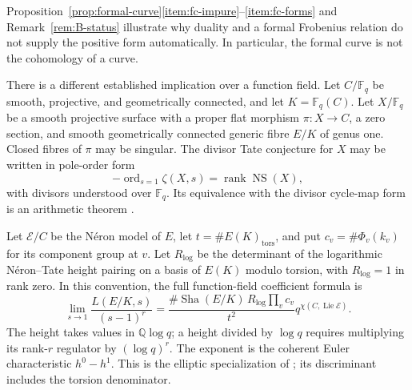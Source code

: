 \documentclass[11pt]{amsart}
\theoremstyle{plain}
\theoremstyle{definition}
\theoremstyle{remark}
\numberwithin{equation}{section}
\newcommand{\Q}{\mathbb{Q}}
\newcommand{\F}{\mathbb{F}}
\DeclareMathOperator{\ord}{ord}
\newcommand{\Sha}{\operatorname{Sha}}
\begin{document}
Proposition~\ref{prop:formal-curve}\ref{item:fc-impure}--\ref{item:fc-forms}
and Remark~\ref{rem:B-status} illustrate why duality and a formal
Frobenius relation do not supply the positive form automatically.
In particular, the formal curve is not the cohomology of a curve.

There is a different established implication over a function field.
Let $C/\F_q$ be smooth, projective, and geometrically connected, and
let $K=\F_q(C)$. Let $X/\F_q$ be a smooth projective surface with a
proper flat morphism $\pi:X\to C$, a zero section, and smooth
geometrically connected generic fibre $E/K$ of genus one. Closed
fibres of $\pi$ may be singular. The divisor Tate conjecture for $X$
may be written in pole-order form
\[
  -\ord_{s=1}\zeta(X,s)=\operatorname{rank}\operatorname{NS}(X),
\]
with divisors understood over $\F_q$.
Its equivalence with the divisor cycle-map form is an arithmetic
theorem \cite[Theorem~6.1.2]{Ulmer2012CurvesJacobians}.

Let $\mathcal E/C$ be the N\'eron model of $E$, let
$t=\#E(K)_{\mathrm{tors}}$, and put
$c_v=\#\Phi_v(k_v)$ for its component group at $v$.
Let $R_{\log}$ be the determinant of the logarithmic N\'eron--Tate
height pairing on a basis of $E(K)$ modulo torsion, with $R_{\log}=1$
in rank zero. In this convention, the full function-field coefficient
formula is
\begin{equation}\label{eq:bsd-function-field}
 \lim_{s\to1}\frac{L(E/K,s)}{(s-1)^r}
 =\frac{\#\Sha(E/K)\,R_{\log}\prod_v c_v}{t^2}
    q^{\chi(C,\operatorname{Lie}\mathcal E)}.
\end{equation}
The height takes values in $\Q\log q$; a height divided by $\log q$
requires multiplying its rank-$r$ regulator by $(\log q)^r$.
The exponent is the coherent Euler characteristic $h^0-h^1$.
This is the elliptic specialization of
\cite[Conjecture~1.3, (1.10) and \S1.4]%
{LichtenbaumRamachandranSuzuki2022ArtinTateBSD}; its discriminant
includes the torsion denominator.
\end{document}
